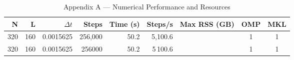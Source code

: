 \begin{table}[ht]
\centering
\caption{Appendix A — Numerical Performance and Resources}
\label{tab:methods}
\begin{tabular}{rrrrrrrcc}
\hline
N & L & $\Delta t$ & Steps & Time (s) & Steps/s & Max RSS (GB) & OMP & MKL\\
\hline
320 & 160 & 0.0015625 & 256,000 & 50.2 & 5,100.6 &  & 1 & 1\\
\hline
320 & 160 & 0.0015625 & 256000 & 50.2 & 5\,100.6 &  & 1 & 1\\
\hline
\end{tabular}
\end{table}